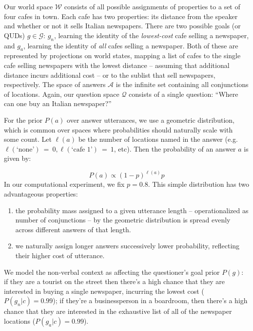\documentclass[12pt, floatsintext, jou]{apa6}
\begin{document}
Our world space $\mathcal{W}$ consists of all possible assignments of properties to a set of four cafes in town. Each cafe has two properties: its distance from the speaker and whether or not it sells Italian newspapers. There are two possible goals (or QUDs) $g \in \mathcal{G}$: $g_{n}$, learning the identity of the \emph{lowest-cost} cafe selling a newspaper, and $g_{a}$, learning the identity of \emph{all} cafes selling a newspaper. Both of these are represented by projections on world states, mapping a list of cafes to the single cafe selling newspapers with the lowest distance -- assuming that additional distance incurs additional cost -- or to the sublist that sell newspapers, respectively. The space of answers $\mathcal{A}$ is the infinite set containing all conjunctions of locations. Again, our question space $\mathcal{Q}$ consists of a single question: ``Where can one buy an Italian newspaper?''

For the prior $P(a)$ over answer utterances, we use a geometric distribution, which is common over spaces where probabilities should naturally scale with some count. Let $\ell(a)$ be the number of locations named in the answer (e.g. $\ell(\textrm{`none'})~=~0, \ell(\textrm{`cafe 1'})~=~1$, etc). Then the probability of an answer $a$ is given by:

$$P(a) \propto (1 - p)^{\ell(a)}p$$
In our computational experiment, we fix $p = 0.8$. 
This simple distribution has two advantageous properties: 
\begin{enumerate}[(1)]
\item the probability mass assigned to a given utterance length -- operationalized as number of conjunctions -- by the geometric distribution is spread evenly across different answers of that length.
\item we naturally assign longer answers successively lower probability, reflecting their higher cost of utterance. \end{enumerate}

We model the non-verbal context as affecting the questioner's goal prior $P(g)$: if they are a tourist on the street then there's a high chance that they are interested in buying a single newspaper, incurring the lowest cost ($P(g_n | c) = 0.99$); if they're a businessperson in a boardroom, then there's a high chance that they are interested in the exhaustive list of all of the newspaper locations ($P(g_a | c) = 0.99$).
\end{document}
